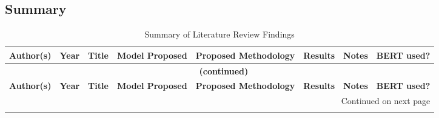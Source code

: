 \documentclass[stu,12pt,floatsintext,donotrepeattitle]{apa7}
\begin{document}
\subsection{Summary}
\begin{landscape}
\pagestyle{empty} %
\begingroup
\tiny
\setlength{\tabcolsep}{3pt}
\renewcommand{\arraystretch}{1.3}
\setlength\LTleft{0pt}
\setlength\LTright{0pt}

\begin{longtable}{@{} p{2cm} p{1cm} p{3.2cm} p{3.2cm} p{4cm} p{2.3cm} p{3.5cm} p{1.2cm} @{}}
\caption{Summary of Literature Review Findings} \label{tab:lit_review_summary} \\
    \toprule
    \textbf{Author(s)} & \textbf{Year} & \textbf{Title} &  \textbf{Model Proposed} & \textbf{Proposed Methodology} & \textbf{Results} & \textbf{Notes} & \textbf{BERT used?} \\
    \midrule
\endfirsthead

\multicolumn{8}{c}{{\bfseries \tablename\ \thetable{} (continued)}} \\
    \toprule
    \textbf{Author(s)} & \textbf{Year} & \textbf{Title} &  \textbf{Model Proposed} & \textbf{Proposed Methodology} & \textbf{Results} & \textbf{Notes} & \textbf{BERT used?} \\
    \midrule
\endhead

\bottomrule
\multicolumn{8}{r}{{Continued on next page}} \\
\endfoot


\end{longtable}
\end{landscape}
\end{document}
